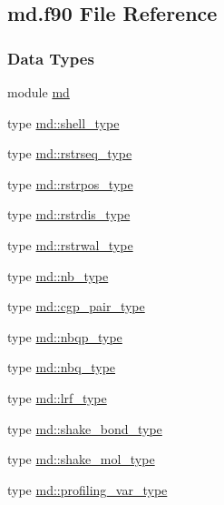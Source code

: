 \hypertarget{md_8f90}{\subsection{md.\-f90 File Reference}
\label{md_8f90}
}
\subsubsection*{Data Types}
\begin{DoxyCompactItemize}
\item 
module \hyperlink{classmd}{md}
\item 
type \hyperlink{structmd_1_1shell__type}{md\-::shell\-\_\-type}
\item 
type \hyperlink{structmd_1_1rstrseq__type}{md\-::rstrseq\-\_\-type}
\item 
type \hyperlink{structmd_1_1rstrpos__type}{md\-::rstrpos\-\_\-type}
\item 
type \hyperlink{structmd_1_1rstrdis__type}{md\-::rstrdis\-\_\-type}
\item 
type \hyperlink{structmd_1_1rstrwal__type}{md\-::rstrwal\-\_\-type}
\item 
type \hyperlink{structmd_1_1nb__type}{md\-::nb\-\_\-type}
\item 
type \hyperlink{structmd_1_1cgp__pair__type}{md\-::cgp\-\_\-pair\-\_\-type}
\item 
type \hyperlink{structmd_1_1nbqp__type}{md\-::nbqp\-\_\-type}
\item 
type \hyperlink{structmd_1_1nbq__type}{md\-::nbq\-\_\-type}
\item 
type \hyperlink{structmd_1_1lrf__type}{md\-::lrf\-\_\-type}
\item 
type \hyperlink{structmd_1_1shake__bond__type}{md\-::shake\-\_\-bond\-\_\-type}
\item 
type \hyperlink{structmd_1_1shake__mol__type}{md\-::shake\-\_\-mol\-\_\-type}
\item 
type \hyperlink{structmd_1_1profiling__var__type}{md\-::profiling\-\_\-var\-\_\-type}
\end{DoxyCompactItemize}
